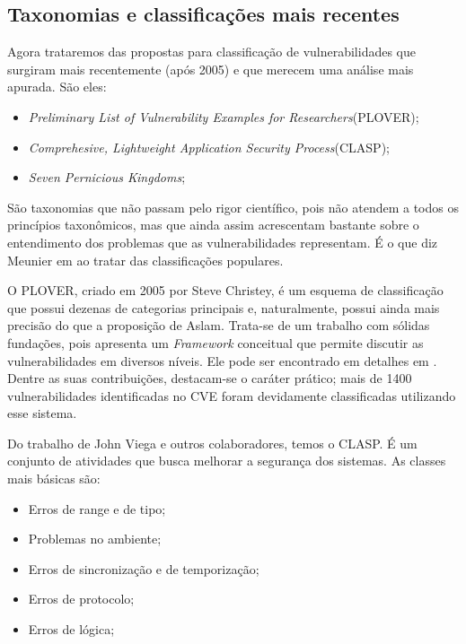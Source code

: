 		\subsection{Taxonomias e classificações mais recentes}
		\label{subsec:prop_taxonomicas_recentes}
			Agora trataremos das propostas para classificação de vulnerabilidades que surgiram
			mais recentemente (após 2005) e que merecem uma análise mais apurada. São eles:
			\begin{itemize}
				\item{\textsl{Preliminary List of Vulnerability Examples for Researchers}(PLOVER);}
				\item{\textsl{Comprehesive, Lightweight Application Security Process}(CLASP);}
				\item{\textsl{Seven Pernicious Kingdoms};}
			\end{itemize}
			São taxonomias que não passam pelo rigor científico, pois não atendem a todos
			os princípios taxonômicos, mas que ainda assim acrescentam bastante sobre o
			entendimento dos problemas que as vulnerabilidades representam. É o que
			diz Meunier em \cite{Meunier2006} ao tratar das classificações populares.


			O PLOVER, criado em 2005 por Steve Christey, é um esquema de classificação
			que possui dezenas de categorias principais e, naturalmente, possui ainda mais precisão
			do que a proposição de Aslam. Trata-se de um trabalho com sólidas fundações, pois
			apresenta um \textsl{Framework} conceitual que permite discutir as vulnerabilidades
			em diversos níveis. Ele pode ser encontrado em detalhes em \cite{Christey2006}.
			Dentre as suas contribuições, destacam-se o caráter prático; mais de 1400 vulnerabilidades
			identificadas no CVE foram devidamente classificadas utilizando esse sistema.


			Do trabalho de John Viega e outros colaboradores, temos o CLASP. É um conjunto
			de atividades que busca melhorar a segurança dos sistemas.
			As classes mais básicas são:
			\begin{itemize}
				\item{Erros de range e de tipo;}
				\item{Problemas no ambiente;}
				\item{Erros de sincronização e de temporização;}
				\item{Erros de protocolo;}
				\item{Erros de lógica;}
			\end{itemize}
			



